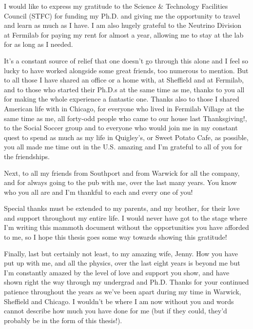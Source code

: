 \begin{acknowledgements}
I would like to express my gratitude to the Science \& Technology Facilities Council (STFC) for funding my Ph.D. and giving me the opportunity to travel and learn as much as I have.  I am also hugely grateful to the Neutrino Division at Fermilab for paying my rent for almost a year, allowing me to stay at the lab for as long as I needed.

It's a constant source of relief that one doesn't go through this alone and I feel so lucky to have worked alongside some great friends, too numerous to mention.  But to all those I have shared an office or a home with, at Sheffield and at Fermilab, and to those who started their Ph.D.s at the same time as me, thanks to you all for making the whole experience a fantastic one.  Thanks also to those I shared American life with in Chicago, for everyone who lived in Fermilab Village at the same time as me, all forty-odd people who came to our house last Thanksgiving!, to the Social Soccer group and to everyone who would join me in my constant quest to spend as much as my life in Quigley's, or Sweet Potato Cafe, as possible, you all made me time out in the U.S. amazing and I'm grateful to all of you for the friendships.

Next, to all my friends from Southport and from Warwick for all the company, and for always going to the pub with me, over the last many years.  You know who you all are and I'm thankful to each and every one of you!

Special thanks must be extended to my parents, and my brother, for their love and support throughout my entire life.  I would never have got to the stage where I'm writing this mammoth document without the opportunities you have afforded to me, so I hope this thesis goes some way towards showing this gratitude!

Finally, last but certainly not least, to my amazing wife, Jenny.  How you have put up with me, and all the physics, over the last eight years is beyond me but I'm constantly amazed by the level of love and support you show, and have shown right the way through my undergrad and Ph.D.  Thanks for your continued patience throughout the years as we've been apart during my time in Warwick, Sheffield and Chicago.  I wouldn't be where I am now without you and words cannot describe how much you have done for me (but if they could, they'd probably be in the form of this thesis!).

\end{acknowledgements}
